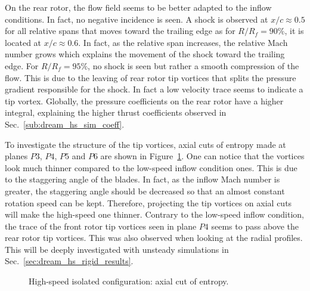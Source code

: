 On the rear rotor, the flow field seems to be better adapted to
the inflow conditions. In fact, no negative incidence is seen.
A shock is observed at $x/c \approx 0.5$ for all relative spans
that moves toward the trailing edge as
for $R / R_f = 90 \%$, it is located at $x/c \approx 0.6$.
In fact, as the relative span increases, the relative Mach
number grows which explains the movement of the shock
toward the trailing edge.
For $R / R_f = 95 \%$, no shock is seen but rather a smooth
compression of the flow. This is due to the 
leaving of rear rotor tip vortices that splits the
pressure gradient responsible for the shock.
In fact a low velocity trace seems to indicate
a tip vortex. Globally, the pressure coefficients on the 
rear rotor have a higher integral, explaining
the higher thrust coefficients observed in Sec.~\ref{sub:dream_hs_sim_coeff}.

To investigate the structure of the tip vortices, axial
cuts of entropy made at planes $P3$, $P4$, $P5$ and $P6$
are shown in Figure~\ref{fig:dream_HS_steady_entropy}. One can notice
that the vortices look much thinner compared to the
low-speed inflow condition ones. This is due to the
staggering angle of the blades. In fact, as the inflow 
Mach number is greater, the staggering angle should be
decreased so that an almost constant rotation speed can be kept.
Therefore, projecting the tip vortices on axial cuts will make
the high-speed one thinner. Contrary to the low-speed
inflow condition, the trace of the front rotor tip vortices
seen in plane $P4$ seems to pass above the rear rotor tip
vortices. This was also observed when looking at the radial profiles.
This will be deeply investigated with unsteady simulations
in Sec.~\ref{sec:dream_hs_rigid_results}.
\begin{figure}[htp]
  \centering
  \caption{High-speed isolated configuration: axial cut of entropy.}
   \label{fig:dream_HS_steady_entropy}
\end{figure}